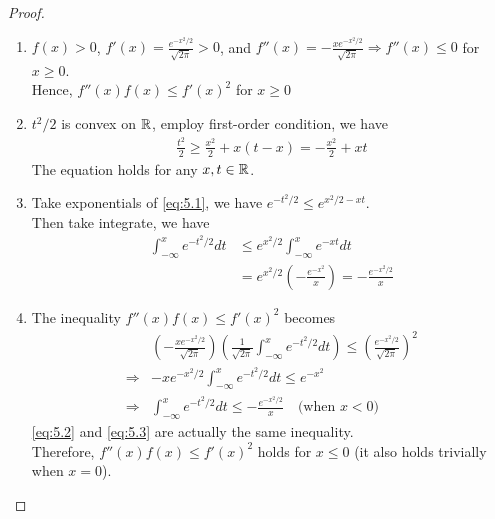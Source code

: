 \documentclass[12pt]{extarticle}
\theoremstyle{definition}
\begin{document}
\begin{proof}
  $ $
  \begin{enumerate}[label=(\alph*)]
    \item $f(x)>0$, $f'(x)=\frac{e^{-x^2/2}}{\sqrt{2\pi}}>0$, and $f''(x)=-\frac{xe^{-x^2/2}}{\sqrt{2\pi}}\Rightarrow f''(x)\le 0$ for $x\ge 0$.\\
          Hence, $f''(x)f(x)\le f'(x)^2$ for $x\ge 0$
    \item $t^2/2$ is convex on $\mathbb{R}$, employ first-order condition, we have
          \begin{align}
            \frac{t^2}{2}\ge \frac{x^2}{2}+x(t-x)=-\frac{x^2}{2}+xt\label{eq:5.1}
          \end{align}
          The equation holds for any $x,t\in\mathbb{R}$.
    \item Take exponentials of \eqref{eq:5.1}, we have $e^{-t^2/2}\le e^{x^2/2-xt}$.\\
          Then take integrate, we have
          \begin{align}
            \int_{-\infty}^xe^{-t^2/2}dt
              & \le e^{x^2/2}\int_{-\infty}^xe^{-xt}dt\nonumber\\
              & = e^{x^2/2}\left(-\frac{e^{-x^2}}{x}\right)=-\frac{e^{-x^2/2}}{x}\label{eq:5.2}
          \end{align}
    \item The inequality $f''(x)f(x)\le f'(x)^2$ becomes
          \begin{align}
            & \left(-\frac{xe^{-x^2/2}}{\sqrt{2\pi}}\right)\left(\frac{1}{\sqrt{2\pi}}\int_{-\infty}^xe^{-t^2/2}dt\right)\le \left(\frac{e^{-x^2/2}}{\sqrt{2\pi}}\right)^2\nonumber\\
            \Rightarrow & -xe^{-x^2/2}\int_{-\infty}^xe^{-t^2/2}dt\le e^{-x^2}\nonumber\\
            \Rightarrow & \int_{-\infty}^xe^{-t^2/2}dt\le -\frac{e^{-x^2/2}}{x}\quad\text{(when }x<0\text{)}\label{eq:5.3}
          \end{align}
          \eqref{eq:5.2} and \eqref{eq:5.3} are actually the same inequality.\\
          Therefore, $f''(x)f(x)\le f'(x)^2$ holds for $x\le 0$ (it also holds trivially when $x=0$).\qedhere
  \end{enumerate}
\end{proof}
\end{document}

